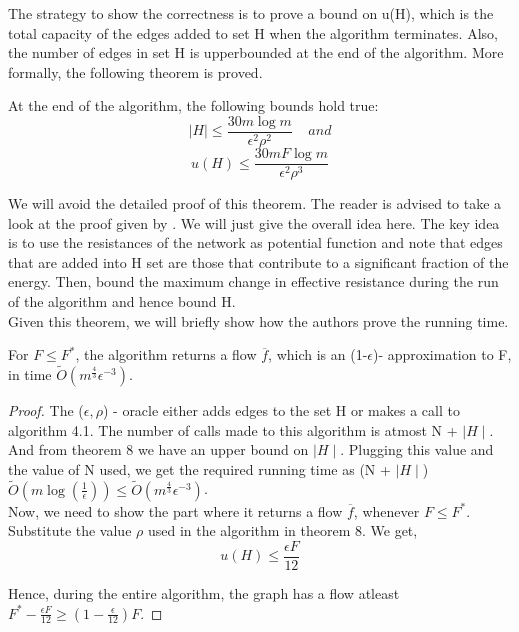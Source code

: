 \documentclass[BTech]{iitmdiss}
\begin{document}
		The strategy to show the correctness is to prove a bound on u(H), which is the total capacity of the edges added to set H when the algorithm
		terminates. Also, the number of edges in set H is upperbounded at the end of the algorithm. More formally, the following theorem is proved. \\
		
		\begin{thm}
		  At the end of the algorithm, the following bounds hold true:
		  $$ \mid H \mid \leq \frac{30 m \log m}{\epsilon^2 \rho ^2} ~~~~~ and$$ 
		  $$ u(H) \leq \frac{30 m F \log m}{\epsilon^2 \rho ^3}$$
		  
		\end{thm}
		
		We will avoid the detailed proof of this theorem. The reader is advised to take a look at the proof given by \cite{DBLP:journals/corr/abs-1010-2921}. We will 
		just give the overall idea here. The key idea is to use the resistances of the network as potential function and note that edges
		that are added into H set are those that contribute to a significant fraction of the energy. Then, bound the maximum change in effective
		resistance during the run of the algorithm and hence bound H. \\
		
		Given this theorem, we will briefly show how the authors prove the running time. \\
		
		\begin{thm}
		  For $F \leq F^{\ast}$, the algorithm returns a flow $\overline{f}$, which is an (1-$\epsilon$)- approximation to F, in time
		  $\widetilde{O}(m^{\frac{4}{3}} \epsilon^{-3})$.
		\end{thm}
		
		\begin{proof}
		  The ($\epsilon, \rho$) - oracle either adds edges to the set H or makes a call to algorithm 4.1. The number of calls made to this 
		  algorithm is atmost N + $\mid H \mid$. And from theorem 8 we have an upper bound on $\mid H \mid$. Plugging this value and the 
		  value of N used, we get the required running time as 
		  (N + $\mid H \mid$)$\widetilde{O}(m \log(\frac{1}{\epsilon})) \leq \widetilde{O}(m^{\frac{4}{3}} \epsilon^{-3})$. \\
		  
		  Now, we need to show the part where it returns a flow $\overline{f}$, whenever $F \leq F^{\ast}$. \\
		  
		  Substitute the value $\rho$ used in the algorithm in theorem 8. We get,
		  $$u(H) \leq \frac{\epsilon F}{12}$$
		  
		  Hence, during the entire algorithm, the graph has a flow atleast $F^{\ast} - \frac{\epsilon F}{12} \geq (1-\frac{\epsilon}{12})F$.
		\end{proof}
		
\end{document}
